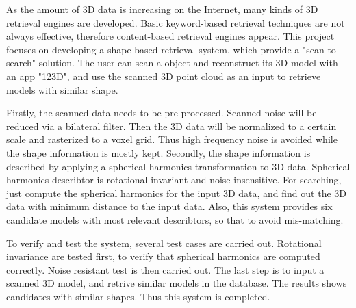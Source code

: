 As the amount of 3D data is increasing on the Internet, many kinds of 3D retrieval engines are developed. Basic keyword-based retrieval techniques are not always effective, therefore content-based retrieval engines appear. This project focuses on developing a shape-based retrieval system, which provide a "scan to search" solution. The user can scan a object and reconstruct its 3D model with an app "123D", and use the scanned 3D point cloud as an input to retrieve models with similar shape. 

Firstly, the scanned data needs to be pre-processed. Scanned noise will be reduced via a bilateral filter. Then the 3D data will be normalized to a certain scale and rasterized to a voxel grid. Thus high frequency noise is avoided while the shape information is mostly kept. Secondly, the shape information is described by applying a spherical harmonics transformation to 3D data. Spherical harmonics describtor is rotational invariant and noise insensitive. For searching, just compute the spherical harmonics for the input 3D data, and find out the 3D data with minimum distance to the input data. Also, this system provides six candidate models with most relevant describtors, so that to avoid mis-matching. 

To verify and test the system, several test cases are carried out. Rotational invariance are tested first, to verify that spherical harmonics are computed correctly. Noise resistant test is then carried out. The last step is to input a scanned 3D model, and retrive similar models in the database. The results shows candidates with similar shapes. Thus this system is completed.